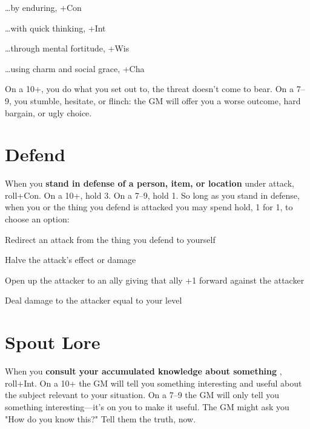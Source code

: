  
\item …by enduring, +Con

 
\item …with quick thinking, +Int

 
\item …through mental fortitude, +Wis

 
\item …using charm and social grace, +Cha


\stopitemize
 

On a 10+, you do what you set out to, the threat doesn't come to bear. On a 7–9, you stumble, hesitate, or flinch: the GM will offer you a worse outcome, hard bargain, or ugly choice.

 
\section{Defend}   
 

When you {\bf stand in defense of a person, item, or location}  under attack, roll+Con. On a 10+, hold 3. On a 7–9, hold 1. So long as you stand in defense, when you or the thing you defend is attacked you may spend hold, 1 for 1, to choose an option:

 
\startitemize[1,packed]

\item Redirect an attack from the thing you defend to yourself

  
\item Halve the attack's effect or damage

 
\item Open up the attacker to an ally giving that ally +1 forward against the attacker

 
\item Deal damage to the attacker equal to your level


\stopitemize
 
\section{Spout Lore}    
 

When you {\bf consult your accumulated knowledge about something} , roll+Int. On a 10+ the GM will tell you something interesting and useful about the subject relevant to your situation. On a 7–9 the GM will only tell you something interesting—it's on you to make it useful. The GM might ask you "How do you know this?" Tell them the truth, now.

